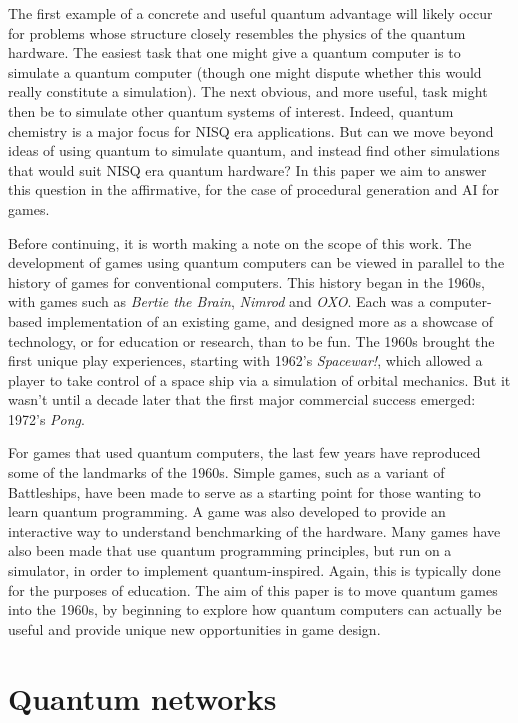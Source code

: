\documentclass[conference]{IEEEtran}
\begin{document}
The first example of a concrete and useful quantum advantage will likely occur for problems whose structure closely resembles the physics of the quantum hardware. The easiest task that one might give a quantum computer is to simulate a quantum computer (though one might dispute whether this would really constitute a simulation). The next obvious, and more useful, task might then be to simulate other quantum systems of interest. Indeed, quantum chemistry is a major focus for NISQ era applications. But can we move beyond ideas of using quantum to simulate quantum, and instead find other simulations that would suit NISQ era quantum hardware? In this paper we aim to answer this question in the affirmative, for the case of procedural generation and AI for games.

Before continuing, it is worth making a note on the scope of this work. The development of games using quantum computers can be viewed in parallel to the history of games for conventional computers. This history began in the 1960s, with games such as  \textit{Bertie the Brain},  \textit{Nimrod} and  \textit{OXO}. Each was a computer-based implementation of an existing game, and designed more as a showcase of technology, or for education or research, than to be fun. The 1960s brought the first unique play experiences, starting with 1962’s \textit{Spacewar!}, which allowed a player to take control of a space ship via a simulation of orbital mechanics. But it wasn’t until a decade later that the first major commercial success emerged: 1972’s  \textit{Pong}.

For games that used quantum computers, the last few years have reproduced some of the landmarks of the 1960s. Simple games, such as a variant of Battleships, have been made to serve as a starting point for those wanting to learn quantum programming. A game was also developed to provide an interactive way to understand benchmarking of the hardware. Many games have also been made that use quantum programming principles, but run on a simulator, in order to implement quantum-inspired. Again, this is typically done for the purposes of education. The aim of this paper is to move quantum games into the 1960s, by beginning to explore how quantum computers can actually be useful and provide unique new opportunities in game design.

\section{Quantum networks}
\end{document}
